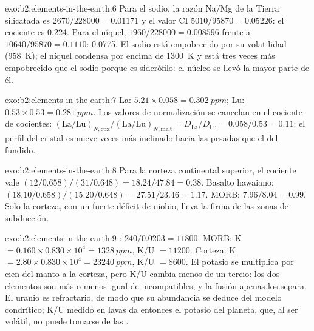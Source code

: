 \begin{solution}{exo:b2:elements-in-the-earth:6}
Para el sodio, la razón Na/Mg de la Tierra silicatada es $2670/\num{228000} = 0.01171$ y el valor
CI $5010/\num{95870} = 0.05226$: el cociente es 0.224. Para el níquel, $1960/\num{228000}
= 0.008596$ frente a $\num{10640}/\num{95870} = 0.1110$: 0.0775. El sodio está
empobrecido por su volatilidad (\qty{958}{K}); el níquel condensa por encima de \qty{1300}{K} y está
tres veces más empobrecido que el sodio porque es siderófilo: el núcleo se llevó la mayor parte
de él.
\end{solution}

\begin{solution}{exo:b2:elements-in-the-earth:7}
La: $5.21\times0.058 = \qty{0.302}{ppm}$; Lu: $0.53\times0.53 = \qty{0.281}{ppm}$. Los
valores de normalización se cancelan en el cociente de cocientes:
$(\mathrm{La}/\mathrm{Lu})_{N,\mathrm{cpx}}/(\mathrm{La}/\mathrm{Lu})_{N,\mathrm{melt}} =
D_{\mathrm{La}}/D_{\mathrm{Lu}} = 0.058/0.53 = 0.11$: el perfil del cristal es nueve
veces más inclinado hacia las  pesadas que el del fundido.
\end{solution}

\begin{solution}{exo:b2:elements-in-the-earth:8}
Para la corteza continental superior, el cociente vale $(12/0.658)/(31/0.648) = 18.24/47.84 = 0.38$. Basalto hawaiano:
$(18.10/0.658)/(15.20/0.648) = 27.51/23.46 = 1.17$. MORB: $7.96/8.04 = 0.99$. Solo la
corteza, con un fuerte déficit de niobio, lleva la firma de las zonas de subducción.
\end{solution}

\begin{solution}{exo:b2:elements-in-the-earth:9}
: $240/0.0203 = \num{11800}$. MORB: K $= 0.160\times0.830\times10^4 =
\qty{1328}{ppm}$, K/U $= \num{11200}$. Corteza: K $= 2.80\times0.830\times10^4 =
\qty{23240}{ppm}$, K/U $= \num{8600}$. El potasio se multiplica por cien del manto a la corteza,
pero K/U cambia menos de un tercio: los dos elementos son más o menos igual de incompatibles,
y la fusión apenas los separa. El uranio es refractario, de modo que su abundancia se deduce
del modelo condrítico; K/U medido en lavas da entonces el potasio del planeta, que,
al ser volátil, no puede tomarse de las .
\end{solution}


